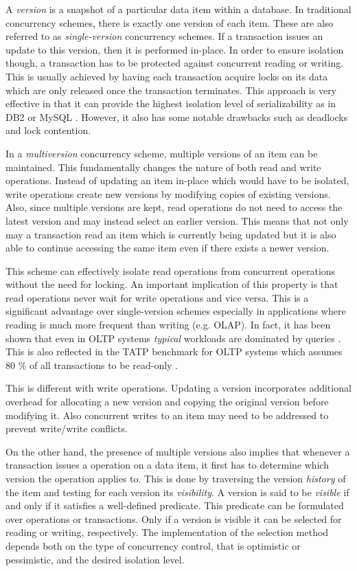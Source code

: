 A \emph{version} is a snapshot of a particular data item within a database. In
traditional concurrency schemes, there is exactly one version of each item.
These are also referred to as \emph{single-version} concurrency schemes. If a
transaction issues an update to this version, then it is performed in-place. In
order to ensure isolation though, a transaction has to be protected against
concurrent reading or writing. This is usually achieved by having each
transaction acquire locks on its data which are only released once the
transaction terminates. This approach is very effective in that it can provide
the highest isolation level of serializability as in DB2 or MySQL
\cite{berenson1995critique}. However, it also has some notable drawbacks such as
deadlocks and lock contention.

In a \emph{multiversion} concurrency scheme, multiple versions of an item can be
maintained. This fundamentally changes the nature of both read and write
operations. Instead of updating an item in-place which would have to be
isolated, write operations create new versions by modifying copies of existing
versions. Also, since multiple versions are kept, read operations do not need to
access the latest version and may instead select an earlier version. This means
that not only may a transaction read an item which is currently being updated
but it is also able to continue accessing the same item even if there exists a
newer version.

This scheme can effectively isolate read operations from concurrent operations
without the need for locking. An important implication of this property is that
read operations never wait for write operations and vice versa. This is a
significant advantage over single-version schemes especially in applications
where reading is much more frequent than writing (e.g. OLAP). In fact, it has
been shown that even in OLTP systems \emph{typical} workloads are dominated by
queries \cite{krueger2011fast}. This is also reflected in the TATP benchmark for
OLTP systems which assumes 80 \% of all transactions to be read-only
\cite{larson2011high, neumann2015fast, oukid2015instant}.

This is different with write operations. Updating a version incorporates
additional overhead for allocating a new version and copying the original
version before modifying it. Also concurrent writes to an item may need to be
addressed to prevent write/write conflicts.

On the other hand, the presence of multiple versions also implies that whenever
a transaction issues a operation on a data item, it first has to determine which
version the operation applies to. This is done by traversing the version
\emph{history} of the item and testing for each version its \emph{visibility}. A
version is said to be \emph{visible} if and only if it satisfies a well-defined
predicate. This predicate can be formulated over operations or transactions.
Only if a version is visible it can be selected for reading or writing,
respectively. The implementation of the selection method depends both on the
type of concurrency control, that is optimistic or pessimistic, and the desired
isolation level.

